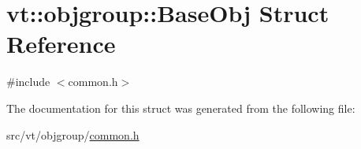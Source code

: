 \hypertarget{structvt_1_1objgroup_1_1_base_obj}{}\section{vt\+:\+:objgroup\+:\+:Base\+Obj Struct Reference}
\label{structvt_1_1objgroup_1_1_base_obj}


{\ttfamily \#include $<$common.\+h$>$}



The documentation for this struct was generated from the following file\+:\begin{DoxyCompactItemize}
\item 
src/vt/objgroup/\hyperlink{objgroup_2common_8h}{common.\+h}\end{DoxyCompactItemize}

